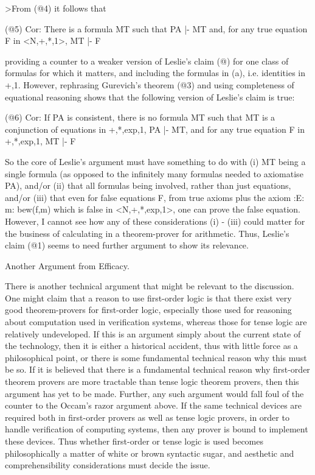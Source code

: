 \begin{spec}
>From (@4) it follows that

(@5) Cor: 
         There is a formula MT such that PA |- MT and, 
         for any true equation F in <N,+,*,1>, 
         MT |- F

providing a counter to a weaker version of Leslie's claim (@) for
one class of formulas for which it matters, and including the
formulas in (a), i.e.  identities in +,1.  However, rephrasing
Gurevich's theorem (@3) and using completeness of equational
reasoning shows that the following version of Leslie's claim is
true:

(@6) Cor: 
         If PA is consistent, there is no formula MT such that 
         MT is a conjunction of equations in +,*,exp,1, PA |- MT,
         and for any true equation F in +,*,exp,1,
         MT |- F

So the core of Leslie's argument must have something to do with (i)
MT being a single formula (as opposed to the infinitely many
formulas needed to axiomatise PA), and/or (ii) that all formulas
being involved, rather than just equations, and/or (iii) that even
for false equations F, from true axioms plus the axiom 
:E: m: bew(f,m) which is false in <N,+,*,exp,1>, one can prove the 
false equation. However, I cannot see how any of these
considerations (i) - (iii) could matter for the business of
calculating in a theorem-prover for arithmetic.  Thus, Leslie's
claim (@1) seems to need further argument to show its relevance.

Another Argument from Efficacy.

There is another technical argument that might be relevant to the
discussion.  One might claim that a reason to use first-order logic
is that there exist very good theorem-provers for first-order logic,
especially those used for reasoning about computation used in
verification systems, whereas those for tense logic are relatively
undeveloped. If this is an argument simply about the current state
of the technology, then it is either a historical accident, thus
with little force as a philosophical point, or there is some
fundamental technical reason why this must be so. If it is believed
that there is a fundamental technical reason why first-order theorem
provers are more tractable than tense logic theorem provers, then
this argument has yet to be made.  Further, any such argument would
fall foul of the counter to the Occam's razor argument above. If the
same technical devices are required both in first-order provers as
well as tense logic provers, in order to handle verification of
computing systems, then any prover is bound to implement these
devices. Thus whether first-order or tense logic is used becomes
philosophically a matter of white or brown syntactic sugar, and
aesthetic and comprehensibility considerations must decide the
issue.


\end{spec}
